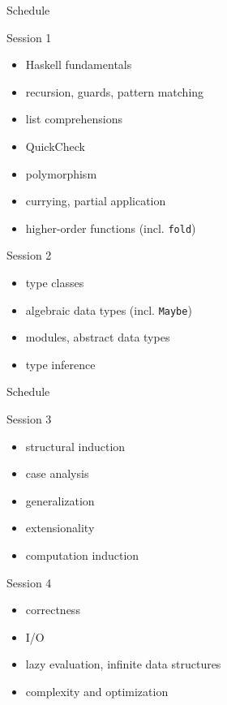 \documentclass{beamer}
\def\code#1{\texttt{\frenchspacing#1}}
\begin{document}
\begin{frame}{Schedule}

\begin{block}{Session 1}
\begin{itemize}
    \item Haskell fundamentals
    \item recursion, guards, pattern matching
    \item list comprehensions
    \item QuickCheck
    \item polymorphism
    \item currying, partial application
    \item higher-order functions (incl. \code{fold})
\end{itemize}
\end{block}

\begin{block}{Session 2}
\begin{itemize}
    \item type classes
    \item algebraic data types (incl. \code{Maybe})
    \item modules, abstract data types
    \item type inference
\end{itemize}
\end{block}

\end{frame}

\begin{frame}{Schedule}

\begin{block}{Session 3}
\begin{itemize}
    \item structural induction
    \item case analysis
    \item generalization
    \item extensionality
    \item computation induction
\end{itemize}
\end{block}

\begin{block}{Session 4}
\begin{itemize}
    \item correctness
    \item I/O
    \item lazy evaluation, infinite data structures
    \item complexity and optimization
\end{itemize}
\end{block}

\end{frame}
\end{document}
